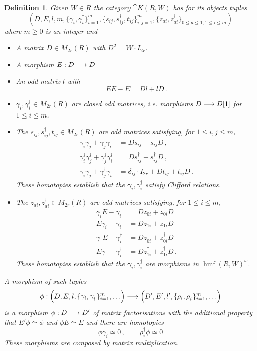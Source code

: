 \documentclass[english,letter paper,12pt,leqno]{article}
\theoremstyle{example}
\newtheorem{definition}[theorem]{Definition}
\numberwithin{equation}{section}
\def\be{\begin{equation}}
\def\ee{\end{equation}}
\DeclareMathOperator{\hmf}{hmf}
\begin{document}
\begin{definition}\label{defn:hmfomegac} Given $W \in R$ the category $\cat{K}(R,W)$ has for its objects tuples
\be\label{eq:hmfomegacd}
\left( D, E, l, m, \{ \gamma_i, \gamma_i^{\dagger} \}_{i=1}^m, \{ s_{ij}, s^{\dagger}_{ij}, t_{ij} \}_{i,j=1}^m, \{ z_{ai}, z^\dagger_{ai} \}_{0 \le a \le 1, 1 \le i \le m} \right)
\ee
where $m \ge 0$ is an integer and
\begin{itemize}
\item A matrix $D \in M_{2r}(R)$ with $D^2 = W \cdot I_{2r}$.
\item A morphism $E: D \longrightarrow D$
\item An odd matrix $l$ with
\be\label{eq:defnhmfomega2}
EE - E = Dl + lD\,.
\ee
\item $\gamma_i, \gamma_i^{\dagger} \in M_{2r}(R)$ are closed odd matrices, i.e. morphisms $D \longrightarrow D[1]$ for $1 \le i \le m$.
\item The $s_{ij}, s^\dagger_{ij}, t_{ij} \in M_{2r}(R)$ are odd matrices satisfying, for $1 \le i,j \le m$,
\begin{align}
\gamma_i \gamma_j + \gamma_j \gamma_i &= D s_{ij} + s_{ij} D \,,\label{eq:hmfomegac3}\\
\gamma^\dagger_i \gamma^\dagger_j + \gamma^\dagger_j \gamma^\dagger_i &= D s^\dagger_{ij} + s^\dagger_{ij} D\,,\label{eq:hmfomegac4}\\
\gamma_i \gamma_j^\dagger + \gamma_j^\dagger \gamma_i &= \delta_{ij} \cdot I_{2r} + D t_{ij} + t_{ij} D\,.\label{eq:hmfomegac5}
\end{align}
These homotopies establish that the $\gamma_i, \gamma^\dagger_i$ satisfy Clifford relations.
\item The $z_{ai}, z^\dagger_{ai} \in M_{2r}(R)$ are odd matrices satisfying, for $1 \le i \le m$,
\begin{align}
\gamma_i E - \gamma_i &= D z_{0i} + z_{0i} D\,\label{eq:hmfomegac6}\\
E \gamma_i - \gamma_i &= D z_{1i} + z_{1i} D\,\label{eq:hmfomegac7}\\
\gamma^\dagger E - \gamma^\dagger_i &= Dz^\dagger_{0i} + z^\dagger_{0i} D\,\label{eq:hmfomegac8}\\
E \gamma^\dagger - \gamma^\dagger_i &= Dz^\dagger_{1i} + z^\dagger_{1i} D\,.\label{eq:hmfomegac9}
\end{align}
These homotopies establish that the $\gamma_i, \gamma^\dagger_i$ are morphisms in $\hmf(R,W)^\omega$.
\end{itemize}
A \emph{morphism} of such tuples
\[
\phi: \left( D,E,l, \{ \gamma_i, \gamma_i^{\dagger} \}_{i=1}^m, \ldots \right) \longrightarrow \left( D',E',l', \{ \rho_i, \rho_i^{\dagger} \}_{i=1}^m, \ldots \right)
\]
is a morphism $\phi: D \longrightarrow D'$ of matrix factorisations with the additional property that $E' \phi \simeq \phi$ and $\phi E \simeq E$ and there are homotopies
\be
\phi \gamma_i \simeq 0\,, \qquad \rho_i^\dagger \phi \simeq 0
\ee
These morphisms are composed by matrix multiplication.
\end{definition}
\end{document}
